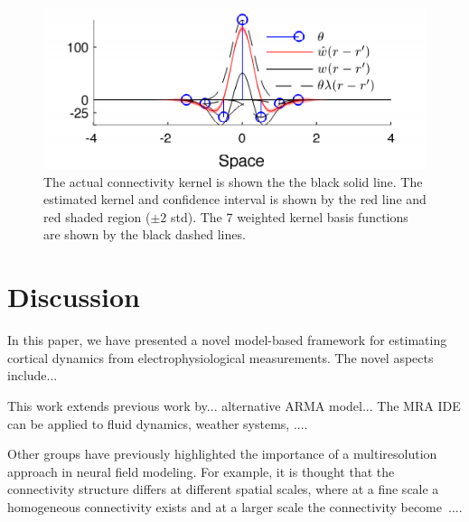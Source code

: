 \documentclass[journal,a4paper]{IEEEtran}
\begin{document}
\begin{figure}[!h] 
 \centering
 \includegraphics[scale=1]{./Graph/KernelEstimate.pdf}
 \caption{The actual connectivity kernel is shown the the black solid line. The estimated kernel and confidence interval is shown by the red line and red shaded region ($\pm2$ std). The 7 weighted kernel basis functions are shown by the black dashed lines.}
 \label{fig:KernelEstimate}
 \end{figure}

\section{Discussion}
In this paper, we have presented a novel model-based framework for estimating cortical dynamics from electrophysiological measurements. The novel aspects include...

This work extends previous work by... alternative ARMA model... The MRA IDE can be applied to fluid dynamics, weather systems, ....

Other groups have previously highlighted the importance of a multiresolution approach in neural field modeling. For example, it is thought that the connectivity structure differs at different spatial scales, where at a fine scale a homogeneous connectivity exists and at a larger scale the connectivity become~\cite{Qubbaj2009}....
\end{document}
